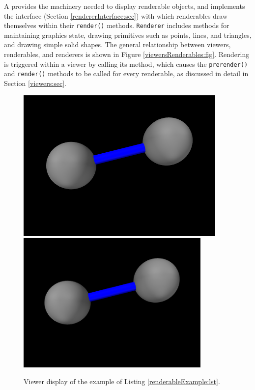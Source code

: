 A  provides the machinery needed to
display renderable objects, and implements the
 interface (Section
\ref{rendererInterface:sec}) with which renderables draw themselves
within their {\tt render()} methods.  {\tt Renderer} includes
methods for maintaining graphics state, drawing primitives such as
points, lines, and triangles, and drawing simple solid shapes.  The
general relationship between viewers, renderables, and renderers is
shown in Figure \ref{viewersRenderables:fig}.  Rendering is triggered
within a viewer by calling its
 method, which causes
the {\tt prerender()} and {\tt render()} methods to be called for
every renderable, as discussed in detail in Section \ref{viewers:sec}.

%
\begin{figure}[t]
\begin{center}
\iflatexml
 \includegraphics[]{images/renderableExample}
\else
 \includegraphics[width=3.75in]{images/renderableExample}
\fi
\end{center}
\caption{Viewer display of the example of Listing \ref{renderableExample:lst}.}
\label{renderableExample:fig}
\end{figure}
%

